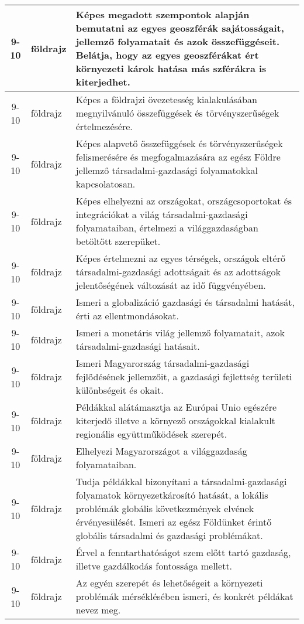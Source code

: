 \begin{small}
\begin{longtable}{c | p{2cm} |  p{11cm} }
              9-10 & földrajz & Képes megadott szempontok alapján bemutatni az egyes geoszférák sajátosságait, jellemző folyamatait és azok összefüggéseit. Belátja, hogy az egyes geoszférákat ért környezeti károk hatása más szférákra is kiterjedhet. \\ \hline
              9-10 & földrajz & Képes a földrajzi övezetesség kialakulásában megnyilvánuló összefüggések és törvényszerűségek értelmezésére. \\ \hline
              9-10 & földrajz & Képes alapvető összefüggések és törvényszerűségek felismerésére és megfogalmazására az egész Földre jellemző társadalmi-gazdasági folyamatokkal kapcsolatosan. \\ \hline
              9-10 & földrajz & Képes elhelyezni az országokat, országcsoportokat és integrációkat a világ társadalmi-gazdasági folyamataiban, értelmezi a világgazdaságban betöltött szerepüket. \\ \hline
              9-10 & földrajz & Képes értelmezni az egyes térségek, országok eltérő társadalmi-gazdasági adottságait és az adottságok jelentőségének változását az idő függvényében. \\ \hline
              9-10 & földrajz & Ismeri a globalizáció gazdasági és társadalmi hatását, érti az ellentmondásokat. \\ \hline
              9-10 & földrajz & Ismeri a monetáris világ jellemző folyamatait, azok társadalmi-gazdasági hatásait. \\ \hline
              9-10 & földrajz & Ismeri Magyarország társadalmi-gazdasági fejlődésének jellemzőit, a gazdasági fejlettség területi különbségeit és okait. \\ \hline
              9-10 & földrajz & Példákkal alátámasztja az Európai Unio egészére kiterjedő illetve a környező országokkal kialakult regionális együttműködések szerepét. \\ \hline
              9-10 & földrajz & Elhelyezi Magyarországot a világgazdaság folyamataiban. \\ \hline
              9-10 & földrajz & Tudja példákkal bizonyítani a társadalmi-gazdasági folyamatok környezetkárosító hatását, a lokális problémák globális következmények elvének érvényesülését. Ismeri az egész Földünket érintő globális társadalmi és gazdasági problémákat. \\ \hline
              9-10 & földrajz & Érvel a fenntarthatóságot szem előtt tartó gazdaság, illetve gazdálkodás fontossága mellett. \\ \hline
              9-10 & földrajz & Az egyén szerepét és lehetőségeit a környezeti problémák mérséklésében ismeri, és konkrét példákat nevez meg. \\ \hline

\end{longtable}
\end{small}
